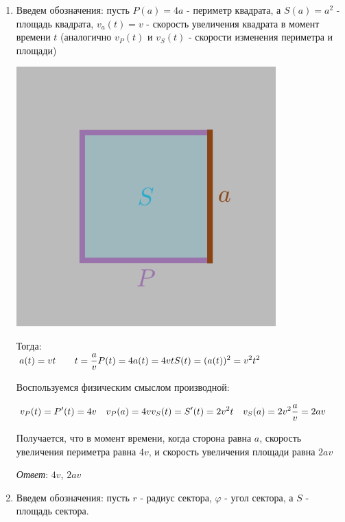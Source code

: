 \begin{enumerate}
    \item Введем обозначения: пусть $P(a) = 4a$ - периметр квадрата, а $S(a) = a^2$ - площадь квадрата,
    $v_a(t) = v$ - скорость увеличения квадрата в момент времени $t$ (аналогично $v_P(t)$ и $v_S(t)$ - скорости изменения периметра и площади)

    \begin{center}
        \includegraphics[width=10cm]{images/3a1}
    \end{center}

    Тогда:\\
    $\displaystyle a(t) = vt \qquad t = \frac{a}{v}\\
    P(t) = 4a(t) = 4vt\\
    S(t) = (a(t))^2 = v^2 t^2$

    Воспользуемся физическим смыслом производной:

    $\displaystyle v_P(t) = P^\prime(t) = 4v \quad v_P(a) = 4v\\
    v_S(t) = S^\prime(t) = 2 v^2 t \quad v_S(a) = 2 v^2 \frac{a}{v} = 2av$

    Получается, что в момент времени, когда сторона равна $a$, скорость увеличения периметра равна $4v$, и скорость увеличения площади равна $2av$

    \vspace{5mm}
    \textit{Ответ}: $4v$, $2av$

    \vspace{5mm}

    \item Введем обозначения: пусть $r$ - радиус сектора, $\varphi$ - угол сектора, а $S$ - площадь сектора.


\end{enumerate}
